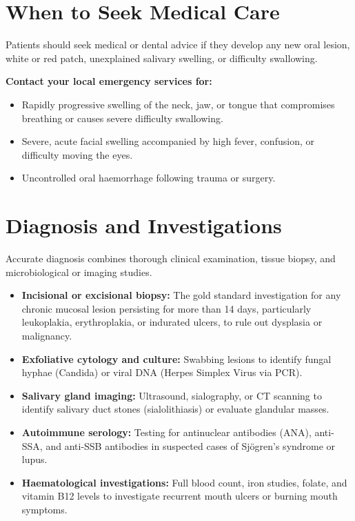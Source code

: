 \section*{When to Seek Medical Care}
Patients should seek medical or dental advice if they develop any new oral lesion, white or red patch, unexplained salivary swelling, or difficulty swallowing.

\textbf{Contact your local emergency services for:}
\begin{itemize}
    \item Rapidly progressive swelling of the neck, jaw, or tongue that compromises breathing or causes severe difficulty swallowing.
    \item Severe, acute facial swelling accompanied by high fever, confusion, or difficulty moving the eyes.
    \item Uncontrolled oral haemorrhage following trauma or surgery.
\end{itemize}

\section*{Diagnosis and Investigations}
Accurate diagnosis combines thorough clinical examination, tissue biopsy, and microbiological or imaging studies.
\begin{itemize}
    \item \textbf{Incisional or excisional biopsy:} The gold standard investigation for any chronic mucosal lesion persisting for more than 14 days, particularly leukoplakia, erythroplakia, or indurated ulcers, to rule out dysplasia or malignancy.
    \item \textbf{Exfoliative cytology and culture:} Swabbing lesions to identify fungal hyphae (Candida) or viral DNA (Herpes Simplex Virus via PCR).
    \item \textbf{Salivary gland imaging:} Ultrasound, sialography, or CT scanning to identify salivary duct stones (sialolithiasis) or evaluate glandular masses.
    \item \textbf{Autoimmune serology:} Testing for antinuclear antibodies (ANA), anti-SSA, and anti-SSB antibodies in suspected cases of Sjögren's syndrome or lupus.
    \item \textbf{Haematological investigations:} Full blood count, iron studies, folate, and vitamin B12 levels to investigate recurrent mouth ulcers or burning mouth symptoms.
\end{itemize}

